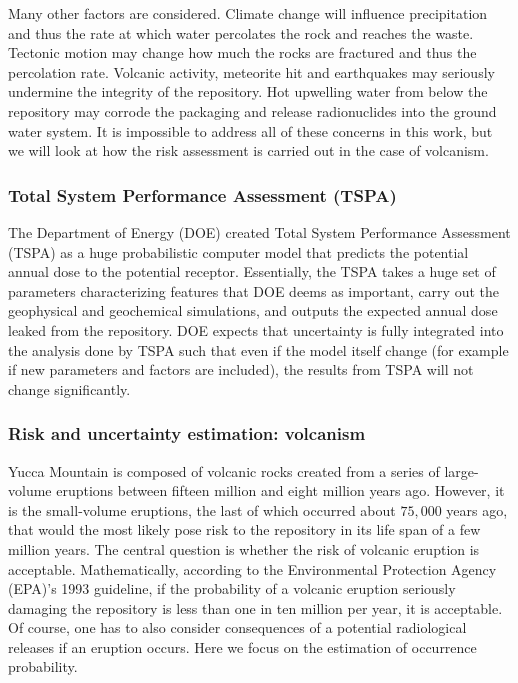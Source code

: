\documentclass[nofootinbib,preprint,aps]{revtex4-1}
\begin{document}
        Many other factors are considered. Climate change will influence precipitation and thus the
        rate at which water percolates the rock and reaches the waste. 
        Tectonic motion may change how much the rocks are fractured and thus the percolation rate.
        Volcanic activity, meteorite hit and earthquakes may seriously undermine the integrity of the repository.
        Hot upwelling water from below the repository may corrode the packaging and release radionuclides into
        the ground water system. It is impossible to address all of these concerns in this work, but we will look
        at how the risk assessment is carried out in the case of volcanism.

        \subsubsection{Total System Performance Assessment (TSPA)}
        The Department of Energy (DOE) created Total System Performance Assessment (TSPA) as a huge probabilistic
        computer model that predicts the potential annual dose to the potential receptor.
        Essentially, the TSPA takes a huge set of parameters characterizing features that DOE deems as important,
        carry out the geophysical and geochemical simulations,
        and outputs the expected annual dose leaked from the repository.
        DOE expects that
        uncertainty is fully integrated into the analysis done by TSPA such that even if the model itself change
        (for example if new parameters and factors are included), the results from TSPA will not change
        significantly.\cite{cv14,ocrwm02} 

        \subsubsection{Risk and uncertainty estimation: volcanism}
        \label{sec:volcano}
        Yucca Mountain is composed of volcanic rocks created from a series of large-volume eruptions between
        fifteen million and eight million years ago. However, it is the small-volume eruptions, the last of
        which occurred about $75,000$ years ago, that would the most likely pose risk to the repository
        in its life span of a few million years.
        The central question is whether the risk of volcanic eruption is acceptable. Mathematically,
        according to the Environmental Protection Agency (EPA)'s 1993 guideline,
        if the probability of a volcanic eruption seriously damaging the repository is less than
        one in ten million per year, it is acceptable.\cite{epa93}
        Of course, one has to also consider consequences of a potential radiological releases if an eruption
        occurs. Here we focus on the estimation of occurrence probability.
\end{document}
